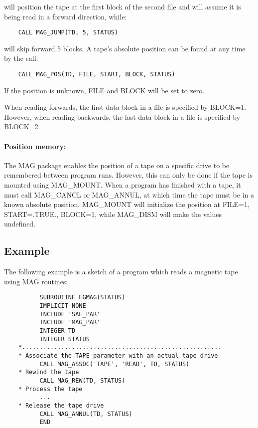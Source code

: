 will position the tape at the first block of the second file and will assume
it is being read in a forward direction, while:

\begin{small}
\begin{verbatim}
    CALL MAG_JUMP(TD, 5, STATUS)
\end{verbatim}
\end{small}

will skip forward 5 blocks.
A tape's absolute position can be found at any time by the call:

\begin{small}
\begin{verbatim}
    CALL MAG_POS(TD, FILE, START, BLOCK, STATUS)
\end{verbatim}
\end{small}

If the position is unknown, FILE and BLOCK will be set to zero.

When reading forwards, the first data block in a file is specified by BLOCK=1.
However, when reading backwards, the last data block in a file is specified
by BLOCK=2.

\paragraph{Position memory:}\hfill

The MAG package enables the position of a tape on a specific drive to be
remembered between program runs.
However, this can only be done if the tape is mounted using MAG\_MOUNT.
When a program has finished with a tape, it must call MAG\_CANCL or
MAG\_ANNUL, at which time the tape must be in a known absolute position.
MAG\_MOUNT will initialize the position at FILE=1, START=.TRUE., BLOCK=1, while
MAG\_DISM  will make the values undefined.

\subsection{Example}

The following example is a sketch of a program which reads a magnetic tape
using MAG routines:

\begin{small}
\begin{verbatim}
          SUBROUTINE EGMAG(STATUS)
          IMPLICIT NONE
          INCLUDE 'SAE_PAR'
          INCLUDE 'MAG_PAR'
          INTEGER TD
          INTEGER STATUS
    *........................................................
    * Associate the TAPE parameter with an actual tape drive
          CALL MAG_ASSOC('TAPE', 'READ', TD, STATUS)
    * Rewind the tape
          CALL MAG_REW(TD, STATUS)
    * Process the tape
          ...
    * Release the tape drive
          CALL MAG_ANNUL(TD, STATUS)
          END
\end{verbatim}
\end{small}

